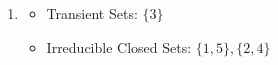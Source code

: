 \documentclass[12pt]{article}
\begin{document}
\begin{enumerate}[label=(\alph*)]
\item
        \begin{minipage}[t]{0.4\textwidth}
          \centering{}
        
        
        \end{minipage}\hfill
        \begin{minipage}[t]{0.65\textwidth}
          \vspace{3\baselineskip}
          \begin{itemize}
                \item Transient Sets: $\{3\}$
                \item Irreducible Closed Sets: $\{1,5\}, \{2,4\}$       
          \end{itemize}
        \end{minipage}
        


\end{enumerate}
\end{document}
